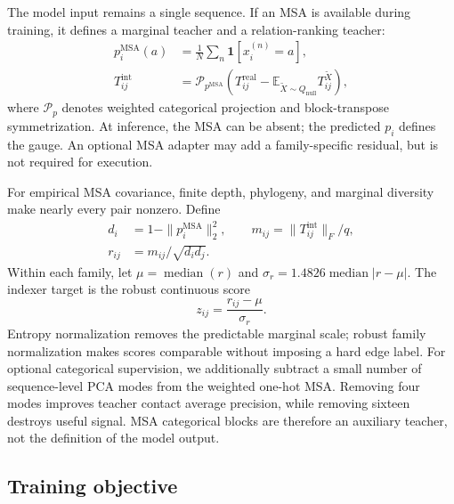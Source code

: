 \documentclass[10pt]{article}
\newcommand{\E}{\mathbb{E}}
\begin{document}
The model input remains a single sequence.  If an MSA is available during training, it defines
a marginal teacher and a relation-ranking teacher:
\begin{align}
p_i^{\mathrm{MSA}}(a) &= \frac{1}{N}\sum_n \mathbf{1}[x_i^{(n)}=a],\\
T_{ij}^{\mathrm{int}} &=
\mathcal{P}_{p^{\mathrm{MSA}}}
\left(
T_{ij}^{\mathrm{real}}-
\E_{\widetilde X\sim Q_{\mathrm{null}}}T_{ij}^{\widetilde X}
\right),
\end{align}
where $\mathcal{P}_p$ denotes weighted categorical projection and block-transpose
symmetrization.  At inference, the MSA can be absent; the predicted $p_i$ defines the gauge.
An optional MSA adapter may add a family-specific residual, but is not required for execution.

For empirical MSA covariance, finite depth, phylogeny, and marginal diversity make nearly
every pair nonzero.  Define
\begin{align}
d_i &= 1-\|p_i^{\mathrm{MSA}}\|_2^2,\qquad
m_{ij}=\|T_{ij}^{\mathrm{int}}\|_F/q,\\
r_{ij} &= m_{ij}/\sqrt{d_i d_j}.
\end{align}
Within each family, let $\mu=\operatorname{median}(r)$ and
$\sigma_r=1.4826\operatorname{median}|r-\mu|$.  The indexer target is the robust continuous
score
\begin{equation}
z_{ij}=\frac{r_{ij}-\mu}{\sigma_r}.
\label{eq:entropy-null}
\end{equation}
Entropy normalization removes the predictable marginal scale; robust family normalization
makes scores comparable without imposing a hard edge label.  For optional categorical
supervision, we additionally subtract a small number of sequence-level PCA modes from the
weighted one-hot MSA.  Removing four modes improves teacher contact average precision, while
removing sixteen destroys useful signal.  MSA categorical blocks are therefore an auxiliary
teacher, not the definition of the model output.

\subsection{Training objective}
\end{document}
